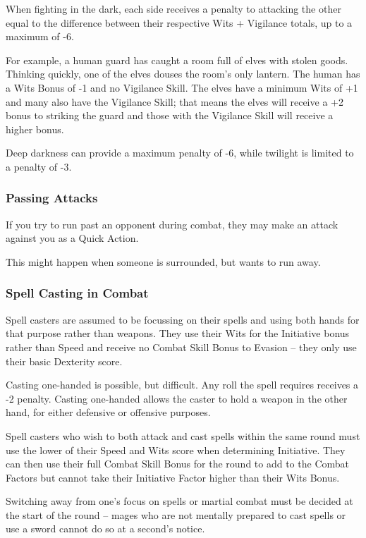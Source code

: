 \begin{multicols}{2}
When fighting in the dark, each side receives a penalty to attacking the other equal to the difference between their respective Wits + Vigilance totals, up to a maximum of -6.

For example, a human guard has caught a room full of elves with stolen goods. Thinking quickly, one of the elves douses the room's only lantern. The human has a Wits Bonus of -1 and no Vigilance Skill. The elves have a minimum Wits of +1 and many also have the Vigilance Skill; that means the elves will receive a +2 bonus to striking the guard and those with the Vigilance Skill will receive a higher bonus.

Deep darkness can provide a maximum penalty of -6, while twilight is limited to a penalty of -3.

\subsubsection{Passing Attacks}

If you try to run past an opponent during combat, they may make an attack against you as a Quick Action.

This might happen when someone is surrounded, but wants to run away.

\subsubsection{Spell Casting in Combat}

Spell casters are assumed to be focussing on their spells and using both hands for that purpose rather than weapons. They use their Wits for the Initiative bonus rather than Speed and receive no Combat Skill Bonus to Evasion -- they only use their basic Dexterity score.

Casting one-handed is possible, but difficult.
Any roll the spell requires receives a -2 penalty.
Casting one-handed allows the caster to hold a weapon in the other hand, for either defensive or offensive purposes.

Spell casters who wish to both attack and cast spells within the same \gls{round} must use the lower of their Speed and Wits score when determining Initiative. They can then use their full Combat Skill Bonus for the \gls{round} to add to the Combat Factors but cannot take their Initiative Factor higher than their Wits Bonus.

Switching away from one's focus on spells or martial combat must be decided at the start of the \gls{round} -- mages who are not mentally prepared to cast spells or use a sword cannot do so at a second's notice.


\end{multicols}
